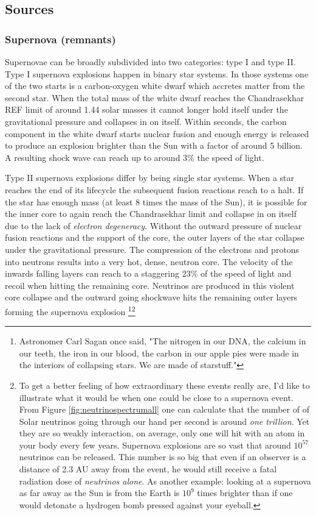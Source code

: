 \subsection{Sources}
\subsubsection{Supernova (remnants)}
Supernovae can be broadly subdivided into two categories: type I and type II. Type I supernova explosions happen in binary star systems. In those systems one of the two starts is a carbon-oxygen white dwarf which accretes matter from the second star. When the total mass of the white dwarf reaches the Chandrasekhar REF limit of around 1.44 solar masses it cannot longer hold itself under the gravitational pressure and collapses in on itself. Within seconds, the carbon component in the white dwarf starts nuclear fusion and enough energy is released to produce an explosion brighter than the Sun with a factor of around 5 billion. 
A resulting shock wave can reach up to around 3\% the speed of light.

Type II supernova explosions differ by being single star systems. When a star reaches the end of its lifecycle the subsequent fusion reactions reach to a halt. If the star has enough mass (at least 8 times the mass of the Sun), it is possible for the inner core to again reach the Chandrasekhar limit and collapse in on itself due to the lack of \textit{electron degeneracy}. Without the outward pressure of nuclear fusion reactions and the support of the core, the outer layers of the star collapse under the gravitational pressure. The compression of the electrons and protons into neutrons results into a very hot, dense, neutron core. The velocity of the inwards falling layers can reach to a staggering 23\% of the speed of light and recoil when hitting the remaining core. Neutrinos are produced in this violent core collapse and the outward going shockwave hits the remaining outer layers forming the supernova explosion \footnote{Astronomer Carl Sagan once said, "The nitrogen in our DNA, the calcium in our teeth, the iron in our blood, the carbon in our apple pies were made in the interiors of collapsing stars. We are made of starstuff."}\footnote{To get a better feeling of how extraordinary these events really are, I'd like to illustrate what it would be when one could be close to a supernova event. From Figure \ref{fig:neutrinospectrumall} one can calculate that the number of of Solar neutrinos going through our hand per second is around \textit{one trillion}. Yet they are so weakly interaction, on average, only one will hit with an atom in your body every few years. Supernova explosions are so vast that around $10^{57}$ neutrinos can be released. This number is so big that even if an observer is a distance of 2.3 AU away from the event, he would still receive a fatal radiation dose of \textit{neutrinos alone}. As another example: looking at a supernova as far away as the Sun is from the Earth is $10^9$ times brighter than if one would detonate a hydrogen bomb pressed against your eyeball.}

